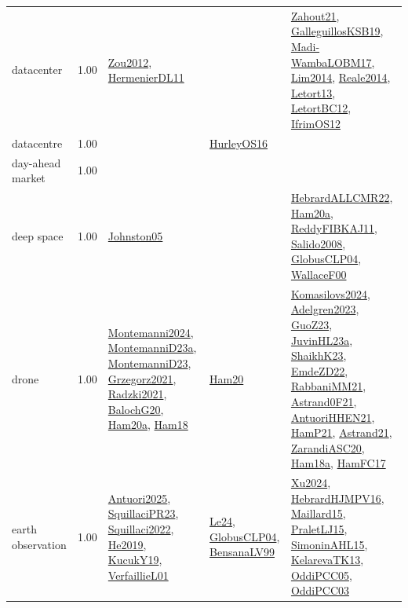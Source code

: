 {\begin{longtable}{p{3cm}r>{\raggedright\arraybackslash}p{6cm}>{\raggedright\arraybackslash}p{6cm}>{\raggedright\arraybackslash}p{8cm}}
\index{datacenter}\index{ApplicationAreas!datacenter}datacenter &  1.00 & \hyperref[detail:Zou2012]{Zou2012}, \hyperref[detail:HermenierDL11]{HermenierDL11} &  & \hyperref[detail:Zahout21]{Zahout21}, \hyperref[detail:GalleguillosKSB19]{GalleguillosKSB19}, \hyperref[detail:Madi-WambaLOBM17]{Madi-WambaLOBM17}, \hyperref[detail:Lim2014]{Lim2014}, \hyperref[detail:Reale2014]{Reale2014}, \hyperref[detail:Letort13]{Letort13}, \hyperref[detail:LetortBC12]{LetortBC12}, \hyperref[detail:IfrimOS12]{IfrimOS12}\\
\index{datacentre}\index{ApplicationAreas!datacentre}datacentre &  1.00 &  & \hyperref[detail:HurleyOS16]{HurleyOS16} & \\
\index{day-ahead market}\index{ApplicationAreas!day-ahead market}day-ahead market &  1.00 &  &  & \\
\index{deep space}\index{ApplicationAreas!deep space}deep space &  1.00 & \hyperref[detail:Johnston05]{Johnston05} &  & \hyperref[detail:HebrardALLCMR22]{HebrardALLCMR22}, \hyperref[detail:Ham20a]{Ham20a}, \hyperref[detail:ReddyFIBKAJ11]{ReddyFIBKAJ11}, \hyperref[detail:Salido2008]{Salido2008}, \hyperref[detail:GlobusCLP04]{GlobusCLP04}, \hyperref[detail:WallaceF00]{WallaceF00}\\
\index{drone}\index{ApplicationAreas!drone}drone &  1.00 & \hyperref[detail:Montemanni2024]{Montemanni2024}, \hyperref[detail:MontemanniD23a]{MontemanniD23a}, \hyperref[detail:MontemanniD23]{MontemanniD23}, \hyperref[detail:Grzegorz2021]{Grzegorz2021}, \hyperref[detail:Radzki2021]{Radzki2021}, \hyperref[detail:BalochG20]{BalochG20}, \hyperref[detail:Ham20a]{Ham20a}, \hyperref[detail:Ham18]{Ham18} & \hyperref[detail:Ham20]{Ham20} & \hyperref[detail:Komasilovs2024]{Komasilovs2024}, \hyperref[detail:Adelgren2023]{Adelgren2023}, \hyperref[detail:GuoZ23]{GuoZ23}, \hyperref[detail:JuvinHL23a]{JuvinHL23a}, \hyperref[detail:ShaikhK23]{ShaikhK23}, \hyperref[detail:EmdeZD22]{EmdeZD22}, \hyperref[detail:RabbaniMM21]{RabbaniMM21}, \hyperref[detail:Astrand0F21]{Astrand0F21}, \hyperref[detail:AntuoriHHEN21]{AntuoriHHEN21}, \hyperref[detail:HamP21]{HamP21}, \hyperref[detail:Astrand21]{Astrand21}, \hyperref[detail:ZarandiASC20]{ZarandiASC20}, \hyperref[detail:Ham18a]{Ham18a}, \hyperref[detail:HamFC17]{HamFC17}\\
\index{earth observation}\index{ApplicationAreas!earth observation}earth observation &  1.00 & \hyperref[detail:Antuori2025]{Antuori2025}, \hyperref[detail:SquillaciPR23]{SquillaciPR23}, \hyperref[detail:Squillaci2022]{Squillaci2022}, \hyperref[detail:He2019]{He2019}, \hyperref[detail:KucukY19]{KucukY19}, \hyperref[detail:VerfaillieL01]{VerfaillieL01} & \hyperref[detail:Le24]{Le24}, \hyperref[detail:GlobusCLP04]{GlobusCLP04}, \hyperref[detail:BensanaLV99]{BensanaLV99} & \hyperref[detail:Xu2024]{Xu2024}, \hyperref[detail:HebrardHJMPV16]{HebrardHJMPV16}, \hyperref[detail:Maillard15]{Maillard15}, \hyperref[detail:PraletLJ15]{PraletLJ15}, \hyperref[detail:SimoninAHL15]{SimoninAHL15}, \hyperref[detail:KelarevaTK13]{KelarevaTK13}, \hyperref[detail:OddiPCC05]{OddiPCC05}, \hyperref[detail:OddiPCC03]{OddiPCC03}\\

\end{longtable}}
